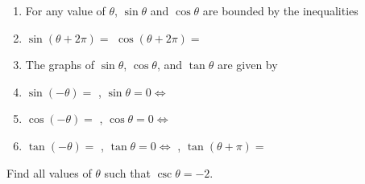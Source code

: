 \documentclass[12pt, a4paper]{article}
\begin{document}
\begin{thrm}
  \begin{enumerate}
  \item For any value of \(\theta\), \(\sin \theta\) and \(\cos
    \theta\) are bounded by the inequalities
    \vspace{0.5in}
  \item \(\sin(\theta + 2\pi) = \) \hspace{1in} \(\cos(\theta+2\pi)=\)
  \item The graphs of \(\sin \theta\), \(\cos \theta\), and \(\tan
    \theta\) are given by
    \vspace{1.5in}
  \item \(\sin (-\theta) = \) \hspace{1in}, \(\sin \theta = 0 \iff \)
  \item \(\cos (-\theta) = \) \hspace{1in}, \(\cos \theta = 0 \iff \)
  \item \(\tan(-\theta) = \) \hspace{1in}, \(\tan \theta = 0 \iff \)
    \hspace{1in}, \(\tan(\theta + \pi) = \) 
  \end{enumerate}
\end{thrm}
\begin{ex}
  Find all values of \(\theta\) such that \(\csc \theta = -2\).
\end{ex}
\end{document}
